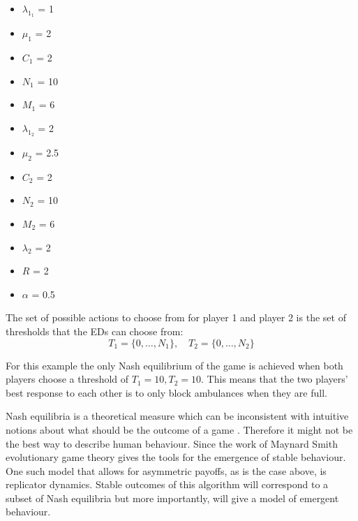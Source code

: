 \begin{multicols}{3}
    \begin{itemize}
        \item \( \lambda_{1_1} \) = 1
        \item \( \mu_1 \) = 2
        \item \( C_1 \) = 2
        \item \( N_1 \) = 10
        \item \( M_1 \) = 6
        \columnbreak

        \item \( \lambda_{1_2} \) = 2
        \item \( \mu_2 \) = 2.5
        \item \( C_2 \) = 2
        \item \( N_2 \) = 10
        \item \( M_2 \) = 6
        \columnbreak

        \item \( \lambda_2 \) = 2
        \item \( R \) = 2
        \item \( \alpha \) = 0.5
    \end{itemize}
\end{multicols}

The set of possible actions to choose from for player 1 and player 2 is the
set of thresholds that the EDs can choose from: 
\begin{equation}
    T_1 = \{ 0, \ldots, N_1 \}, \quad T_2 = \{ 0, \ldots, N_2 \}
\end{equation}

For this example the only Nash equilibrium of the game is achieved when both 
players choose a threshold of \( T_1 = 10, T_2 = 10 \).
This means that the two players' best response to each other is to only block
ambulances when they are full. 

Nash equilibria is a theoretical measure which can be
inconsistent with intuitive notions about what should be the outcome of a 
game \cite{myerson1978refinements}.
Therefore it might not be the best way to describe human behaviour.
Since the work of Maynard Smith \cite{smith1986evolutionary} evolutionary game 
theory gives the tools for the emergence of stable behaviour.
One such model that allows for asymmetric payoffs, as is the case above, is 
replicator dynamics.
Stable outcomes of this algorithm will correspond to a subset of Nash
equilibria but more importantly, will give a model of emergent behaviour. 

